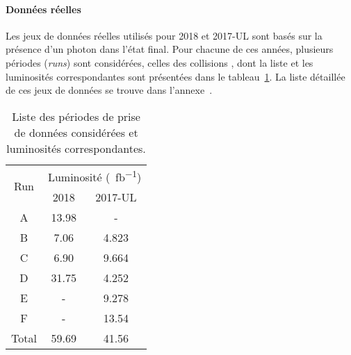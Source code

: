 \paragraph{Données réelles}
Les jeux de données réelles utilisés pour 2018 et 2017-UL sont basés sur la présence d'un photon dans l'état final.
Pour chacune de ces années, plusieurs périodes (\emph{runs}) sont considérées, celles des collisions \proton\proton, dont la liste et les luminosités correspondantes sont présentées dans le tableau~\ref{tab-Runs_and_lumis_2018_and_2017UL_GJet}.
La liste détaillée de ces jeux de données se trouve dans l'annexe~.
\begin{table}[h]
\centering
\begin{tabular}{ccc}
\toprule
\multirow{2}{*}{Run} & \multicolumn{2}{c}{Luminosité (\SI{}{\femto\barn^{-1}})} \\
\cmidrule(lr){2-3}
 & 2018 & 2017-UL \\
\midrule
A & \num{13.98} & - \\
B & \num{7.06} & \num{4.823} \\
C & \num{6.90} & \num{9.664} \\
D & \num{31.75} & \num{4.252} \\
E & - & \num{9.278} \\
F & - & \num{13.54} \\
\midrule
Total & \num{59.69} & \num{41.56} \\
\bottomrule
\end{tabular}
\caption{Liste des périodes de prise de données considérées et luminosités correspondantes.}
\label{tab-Runs_and_lumis_2018_and_2017UL_GJet}
\end{table}
